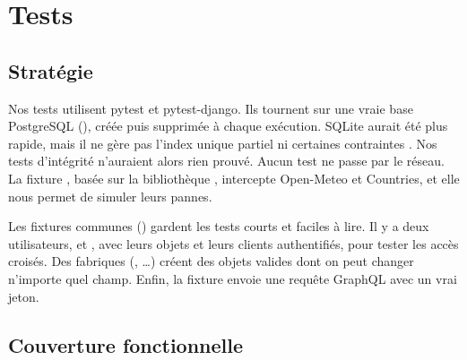 \section{Tests}
\label{sec:tests}

\subsection{Stratégie}

Nos tests utilisent pytest et pytest-django. Ils tournent sur une vraie base PostgreSQL (), créée puis supprimée à chaque exécution. SQLite aurait été plus rapide, mais il ne gère pas l'index unique partiel ni certaines contraintes . Nos tests d'intégrité n'auraient alors rien prouvé. Aucun test ne passe par le réseau. La fixture , basée sur la bibliothèque , intercepte Open-Meteo et Countries, et elle nous permet de simuler leurs pannes.

Les fixtures communes () gardent les tests courts et faciles à lire. Il y a deux utilisateurs,  et , avec leurs objets et leurs clients authentifiés, pour tester les accès croisés. Des fabriques (, \ldots) créent des objets valides dont on peut changer n'importe quel champ. Enfin, la fixture  envoie une requête GraphQL avec un vrai jeton.

\subsection{Couverture fonctionnelle}

